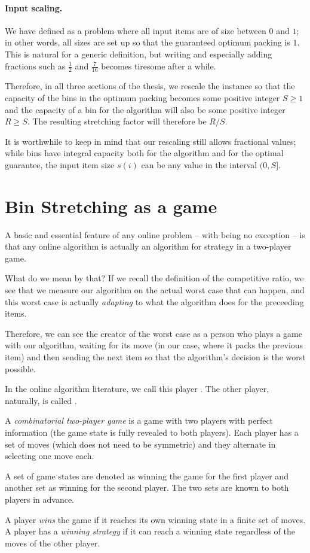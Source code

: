 \paragraph{Input scaling.} We have defined \binstretch as a problem
where all input items are of size between $0$ and $1$; in other words,
all sizes are set up so that the guaranteed optimum packing is $1$.
This is natural for a generic definition, but writing and especially
adding fractions such as $\frac{1}{2}$ and $\frac{7}{16}$ becomes
tiresome after a while.

Therefore, in all three sections of the thesis, we rescale the
instance so that the capacity of the bins in the optimum packing
becomes some positive integer $S \ge 1$ and the capacity of a bin for
the algorithm will also be some positive integer $R \ge S$. The
resulting stretching factor will therefore be $R/S$.

It is worthwhile to keep in mind that our rescaling still allows
fractional values; while bins have integral capacity both for the
algorithm and for the optimal guarantee, the input item size $s(i)$
can be any value in the interval $(0,S]$.

\section{Bin Stretching as a game}\label{sec:binstretchgame}

A basic and essential feature of any online problem -- with
\binstretch being no exception -- is that any online algorithm is
actually an algorithm for strategy in a two-player game.

What do we mean by that? If we recall the definition of the
competitive ratio, we see that we measure our algorithm on the actual
worst case that can happen, and this worst case is actually
\emph{adapting} to what the algorithm does for the preceeding items.

Therefore, we can see the creator of the worst case as a person who
plays a game with our algorithm, waiting for its move (in our case,
where it packs the previous item) and then sending the next item so
that the algorithm's decision is the worst possible.

In the online algorithm literature, we call this player
\adversary. The other player, naturally, is called \algo.

\begin{dfn} 
A \emph{combinatorial two-player game} is a game with two
players with perfect information (the game state is fully revealed to
both players). Each player has a set of moves (which does not need to
be symmetric) and they alternate in selecting one move each.

A set of game states are denoted as winning the game for the first
player and another set as winning for the second player. The two sets
are known to both players in advance.

A player \emph{wins} the game if it reaches its own winning state in a
finite set of moves. A player has a \emph{winning strategy} if
it can reach a winning state regardless of the moves of the other
player.
\end{dfn}

